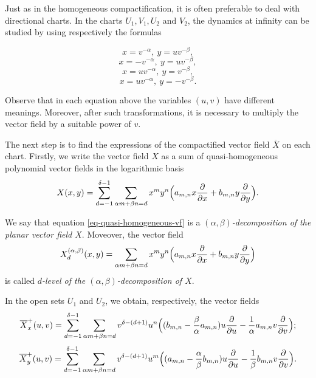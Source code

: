\documentclass[12pt]{amsart}
\begin{document}
Just as in the homogeneous compactification, it is often preferable to deal with directional charts. In the charts $U_{1}, V_{1}, U_{2}$ and $V_{2}$, the dynamics at infinity can be studied by using respectively the formulas \begin{multicols}{2} \noindent\begin{equation}\label{eq-plc-x-positive}
x = v^{-\alpha}, \ y = uv^{-\beta},
\end{equation}
\begin{equation}\label{eq-plc-x-negative}
x = -v^{-\alpha}, \ y = uv^{-\beta},
\end{equation}
\begin{equation}\label{eq-plc-y-positive}
x = uv^{-\alpha}, \ y = v^{-\beta},
\end{equation}
\begin{equation}\label{eq-plc-y-negative}
x = uv^{-\alpha}, \ y = -v^{-\beta}.
\end{equation}\end{multicols}

Observe that in each equation above the variables $(u,v)$ have different meanings. Moreover, after such transformations, it is necessary to multiply the vector field by a suitable power of $v$.

The next step is to find the expressions of the compactified vector field $\overline{X}$ on each chart. Firstly, we write the vector field $X$ as a sum of quasi-homogeneous polynomial vector fields in the logarithmic basis
\begin{equation}\label{eq-quasi-homogeneous-vf}
X(x,y) = \displaystyle\sum_{d=-1}^{\delta -1}\sum_{\alpha m+\beta n=d} x^{m}y^{n}\Big{(}a_{m,n}x\displaystyle\frac{\partial}{\partial x} + b_{m,n}y\displaystyle\frac{\partial}{\partial y}\Big{)}.
\end{equation}


We say that equation \eqref{eq-quasi-homogeneous-vf} is a \emph{$(\alpha,\beta)$-decomposition of the planar vector field $X$}. Moveover, the vector field
$$X^{(\alpha,\beta)}_{d}(x,y) = \sum_{\alpha m+\beta n=d} x^{m}y^{n}\Big{(}a_{m,n}x\displaystyle\frac{\partial}{\partial x} + b_{m,n}y\displaystyle\frac{\partial}{\partial y}\Big{)}$$
is called \emph{$d$-level of the $(\alpha,\beta)$-decomposition of $X$}.

In the open sets $U_{1}$ and $U_{2}$, we obtain, respectively, the vector fields
\begin{equation}\label{eq-plc-x-positive-vf}
\overline{X}_{x}^{+}(u,v) =  \displaystyle\sum_{d=-1}^{\delta -1}\sum_{\alpha m+\beta n=d} v^{\delta-(d+1)}u^{n}\Big{(}(b_{m,n}-\frac{\beta}{\alpha}a_{m,n})u\displaystyle\frac{\partial}{\partial u} - \frac{1}{\alpha}a_{m,n}v\displaystyle\frac{\partial}{\partial v}\Big{)};
\end{equation}
\begin{equation}\label{eq-plc-y-positive-vf}
\overline{X}_{y}^{+}(u,v) =  \displaystyle\sum_{d=-1}^{\delta -1}\sum_{\alpha m+\beta n=d} v^{\delta-(d+1)}u^{m}\Big{(}(a_{m,n}-\frac{\alpha}{\beta}b_{m,n})u\displaystyle\frac{\partial}{\partial u} - \frac{1}{\beta}b_{m,n}v\displaystyle\frac{\partial}{\partial v}\Big{)}.
\end{equation}
\end{document}
